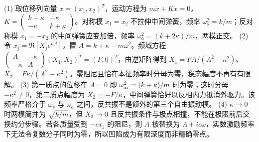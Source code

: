 (1) 取位移列向量 \(x=(x_1,x_2)^T\)，运动方程为 \(m\ddot x+Kx=0\)，\(K=\begin{pmatrix}k+\kappa&-\kappa\\-\kappa&k+\kappa\end{pmatrix}\)。对称模 \(x_1=x_2\) 不拉伸中间弹簧，频率 \(\omega_s^2=k/m\)；反对称模 \(x_1=-x_2\) 的中间弹簧应变加倍，频率 \(\omega_a^2=(k+2\kappa)/m\)，两模正交。
(2) 令 \(x_j=\Re[X_j e^{i\omega t}]\)，置 \(A=k+\kappa-m\omega^2\)。频域方程 \(\begin{pmatrix}A&-\kappa\\-\kappa&A\end{pmatrix}(X_1,X_2)^T=(F,0)^T\)，由逆矩阵得到 \(X_1=FA/(A^2-\kappa^2)\)、\(X_2=F\kappa/(A^2-\kappa^2)\)。零阻尼且恰在本征频率时分母为零，稳态幅度不再有有限解。
(3) 第一质点的位移在 \(A=0\) 即 \(\omega_{\rm ar}^2=(k+\kappa)/m\) 时为零；这时分母 \(-\kappa^2\ne0\)，第二质点幅度为 \(X_2=-F/\kappa\)，中间弹簧恰好以反相内力抵消外驱力。该频率严格介于 \(\omega_s\) 与 \(\omega_a\) 之间，反共振不是额外的第三个自由振动模。
(4) \(\kappa\to0\) 时两模简并为 \(\sqrt{k/m}\)，但 \(X_2\to0\) 且反共振条件与极点相撞，不能在极限前后交换约分步骤。若各质量受到 \(-c\dot x_j\) 的阻尼，则 \(A\) 被替换为 \(A+i c\omega\)，实数激励频率下无法令复数分子同时为零，所以凹陷成为有限深度而非精确零点。
